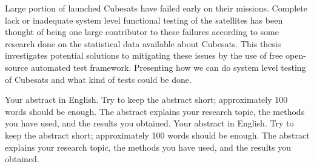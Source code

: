 \documentclass[english,12pt,a4paper,pdftex,elec,utf8]{aaltothesis}
\begin{document}
\makecoverpage



\begin{abstractpage}[english]
 Large portion of launched Cubesats have failed early on their missions. Complete lack or inadequate system level functional testing of the satellites has been thought of being one large contributor to these failures according to some research done on the statistical data available about Cubesats. This thesis investigates potential solutions to mitigating these issues by the use of free open-source automated test framework. Presenting how we can do system level testing of Cubesats and what kind of tests could be done.

  Your abstract in English. Try to keep the abstract short; approximately 
  100 words should be enough. The abstract explains your research topic, 
  the methods you have used, and the results you obtained.  
  Your abstract in English. Try to keep the abstract short; approximately 
  100 words should be enough. The abstract explains your research topic, 
  the methods you have used, and the results you obtained.  
\end{abstractpage}
\end{document}
